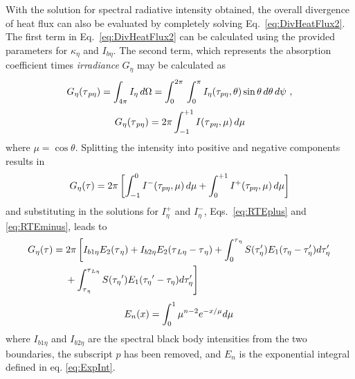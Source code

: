 With the solution for spectral radiative intensity obtained, the overall divergence of heat flux can also be evaluated by completely solving Eq.~\ref{eq:DivHeatFlux2}. The first term in Eq.~\ref{eq:DivHeatFlux2} can be calculated using the provided parameters for $\kappa_\eta$ and $I_{b\eta}$. The second term, which represents the absorption coefficient times \textit{irradiance} $G_\eta$ may be calculated as
\begin{equation}
    \centering
    G_\eta{}(\tau{}_{p\eta})=\int_{4\pi}I_\eta \, d\Omega{}
    =\int_0^{2\pi}{}\int_0^{\pi}I_\eta(\tau_{p\eta},\theta)\sin{\theta} \, d\theta{} \,d\psi{} \ ,
\end{equation}
\begin{equation}
    \centering
    G_\eta{}(\tau{}_{p\eta})=2\pi{}\int_{-1}^{+1}I(\tau{}_{p\eta},\mu) \,d\mu
\end{equation}
where $\mu=\cos{\theta}$. Splitting the intensity into positive and negative components results in
\begin{equation}
    \centering
    G_\eta{}(\tau{})=2\pi{}\left[\int_{-1}^0{} I^-(\tau_{p\eta},\mu)\, d\mu{} + 
    \int_{0}^{+1} I^+(\tau_{p\eta},\mu)\, d\mu{} \right]
\end{equation}
and substituting in the solutions for $I^+_\eta$ and $I^-_\eta$, Eqs.~\ref{eq:RTEplus} and \ref{eq:RTEminus}, leads to
\begin{equation}
\begin{split}
    G_\eta{}(\tau{})&=2\pi{} \left[ I_{b1\eta}E_2(\tau{}_\eta{})+I_{b2\eta}E_2(\tau{}_{L\eta}-\tau{}_\eta{})+\int_0^{\tau{}_\eta{}}S(\tau_\eta')E_1(\tau_\eta-\tau_\eta')d\tau_\eta' \right. \\
    &\quad \left. {}+\int^{\tau{}_{L\eta}}_{\tau{}_\eta{}}S(\tau_\eta{}')E_1(\tau_\eta{}'-\tau_\eta)d\tau_\eta' \vphantom{\frac12}\right]
    \label{eq:IrrPlaneParallel}
\end{split}
\end{equation}
\begin{equation}
    \centering
    E_n(x)=\int_0^1\mu{}^{n-2}e^{-x/\mu{}}d\mu{} \,
    \label{eq:ExpInt}
\end{equation}
where $I_{b1\eta}$ and $I_{b2\eta}$ are the spectral black body intensities from the two boundaries, the subscript $p$ has been removed, and $E_n$ is the exponential integral defined in eq. \ref{eq:ExpInt}. 

